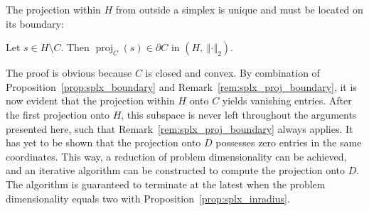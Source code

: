 \documentclass[twoside,11pt]{article}
\DeclareMathOperator{\proj}{proj}
\newcommand{\0}{\mathcal{O}}
\newcommand{\norm}[1]{\left\Vert#1\right\Vert}
\begin{document}
The projection within $H$ from outside a simplex is unique and must be located on its boundary:
\begin{remark}
\label{rem:splx_proj_boundary}
Let $s\in H\setminus C$.
Then $\proj_C(s)\in\partial C$ in $\left(H,\ \norm{\cdot}_2\right)$.
\end{remark}
The proof is obvious because $C$ is closed and convex.
By combination of Proposition~\ref{prop:splx_boundary} and Remark~\ref{rem:splx_proj_boundary}, it is now evident that the projection within $H$ onto $C$ yields vanishing entries.
After the first projection onto $H$, this subspace is never left throughout the arguments presented here, such that Remark~\ref{rem:splx_proj_boundary} always applies.
It has yet to be shown that the projection onto $D$ possesses zero entries in the same coordinates.
This way, a reduction of problem dimensionality can be achieved, and an iterative algorithm can be constructed to compute the projection onto $D$.
The algorithm is guaranteed to terminate at the latest when the problem dimensionality equals two with Proposition~\ref{prop:splx_inradius}.
\end{document}
